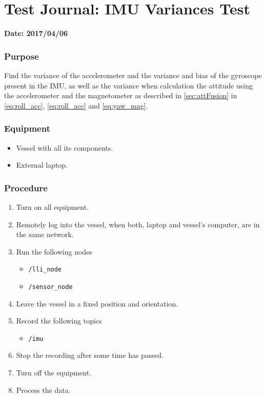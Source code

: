\chapter{Test Journal: IMU Variances Test} \label{app:IMUVariances}

\textbf{Date: 2017/04/06}

\subsection*{Purpose}
Find the variance of the accelerometer and the variance and bias of the gyroscope present in the IMU, as well as the variance when calculation the attitude using the accelerometer and the magnetometer as described in \autoref{sec:attFusion} in \autoref{eq:roll_acc}, \ref{eq:roll_acc} and \ref{eq:yaw_mag}.

\subsection*{Equipment}
\begin{itemize}
    \item Vessel with all its components.
    \item External laptop.
\end{itemize}

\subsection*{Procedure}
\begin{enumerate}
    \item Turn on all equipment.
    \item Remotely log into the vessel, when both, laptop and vessel's computer, are in the same network.
    \item Run the following nodes
    \begin{itemize}
        \item \lstinline[style=cinline]{/lli_node}
        \item \lstinline[style=cinline]{/sensor_node}
    \end{itemize}
    \item Leave the vessel in a fixed position and orientation.
    \item Record the following topics
    \begin{itemize}
        \item \lstinline[style=cinline]{/imu}      
    \end{itemize}
    \item Stop the recording after some time has passed.
    \item Turn off the equipment.
    \item Process the data.
\end{enumerate}


